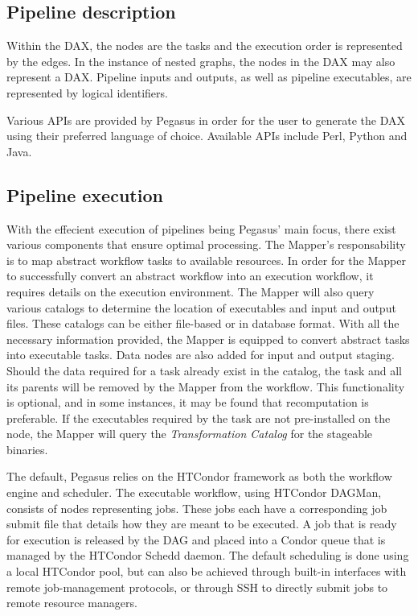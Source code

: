\documentclass{report}
\begin{document}
        \subsection{Pipeline description} Within the DAX, the nodes are the
        tasks and the execution order is represented by the edges.  In the
        instance of nested graphs, the nodes in the DAX may also represent a
        DAX. Pipeline inputs and outputs, as well as pipeline executables, are
        represented by logical identifiers.

         Various APIs are provided by Pegasus in order for the user to generate
         the DAX using their preferred language of choice. Available APIs
         include Perl, Python and Java.  \subsection{Pipeline execution} With
         the effecient execution of pipelines being Pegasus' main focus, there
         exist various components that ensure optimal processing. The Mapper's
         responsability is to map abstract workflow tasks to available
         resources. In order for the Mapper to successfully convert an abstract
         workflow into an execution workflow, it requires details on the
         execution environment. The Mapper will also query various catalogs to
         determine the location of executables and input and output files. These
         catalogs can be either file-based or in database format. With all the
         necessary information provided, the Mapper is equipped to convert
         abstract tasks into executable tasks. Data nodes are also added for
         input and output staging. Should the data required for a task already
         exist in the catalog, the task and all its parents will be removed by
         the Mapper from the workflow. This functionality is optional, and in
         some instances, it may be found that recomputation is preferable. If
         the executables required by the task are not pre-installed on the node,
         the Mapper will query the \textit{Transformation Catalog} for the
         stageable binaries.

        The default, Pegasus relies on the HTCondor framework as both the
        workflow engine and scheduler. The executable workflow, using HTCondor
        DAGMan, consists of nodes representing jobs.  These jobs each have a
        corresponding job submit file that details how they are meant to be
        executed. A job that is ready for execution is released by the DAG and
        placed into a Condor queue that is managed by the HTCondor Schedd
        daemon. The default scheduling is done using a local HTCondor pool, but
        can also be achieved through built-in interfaces with remote
        job-management protocols, or through SSH to directly submit jobs to
        remote resource managers.
\end{document}
